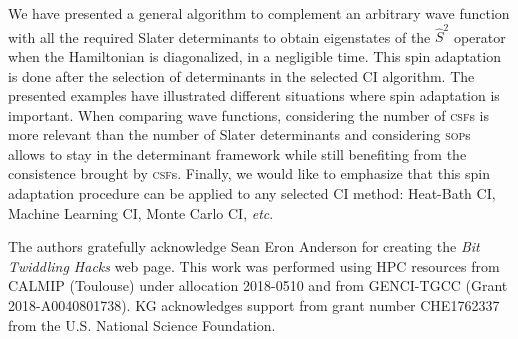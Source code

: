 \documentclass[aip,jcp,reprint,showkeys]{revtex4-1}
\newcommand{\stwo}{\hat{S}^2}
\newcommand{\sop}{\textsc{sop}}
\newcommand{\csf}{\textsc{csf}}
\begin{document}
We have presented a general algorithm to complement an arbitrary wave function
with all the required Slater determinants to obtain eigenstates of the $\stwo$
operator when the Hamiltonian is diagonalized, in a negligible time.  This
spin adaptation is done after the selection of determinants in the selected CI
algorithm.
The presented examples have illustrated different situations where
spin adaptation is important.  When comparing wave functions, considering the
number of \csf s is more relevant than the number of Slater determinants and
considering \sop s allows to stay in the determinant framework while still
benefiting from the consistence brought by \csf s.
Finally, we would like to emphasize that this spin adaptation procedure can be
applied to any selected CI method: Heat-Bath CI, Machine Learning CI, Monte
Carlo CI, \textit{etc}.


\begin{acknowledgments}
The authors gratefully acknowledge Sean Eron Anderson for creating the 
\emph{Bit Twiddling Hacks} web page.
This work was performed using HPC resources from CALMIP (Toulouse) under
allocation 2018-0510 and from GENCI-TGCC (Grant 2018-A0040801738).
KG acknowledges support from grant number CHE1762337 from the U.S. National Science Foundation.
\end{acknowledgments}



\end{document}
